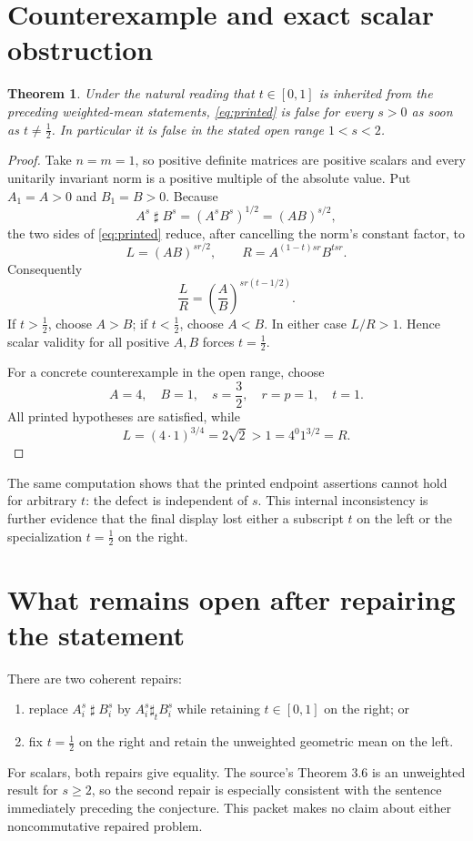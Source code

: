 \documentclass[11pt]{article}
\newtheorem{theorem}{Theorem}
\newcommand{\gm}{\mathbin{\sharp}}
\newcommand{\gmt}{\mathbin{\sharp_t}}
\begin{document}
\section{Counterexample and exact scalar obstruction}

\begin{theorem}\label{thm:counterexample}
Under the natural reading that $t\in[0,1]$ is inherited from the preceding
weighted-mean statements, \eqref{eq:printed} is false for every $s>0$ as
soon as $t\neq\tfrac12$.  In particular it is false in the stated open range
$1<s<2$.
\end{theorem}

\begin{proof}
Take $n=m=1$, so positive definite matrices are positive scalars and every
unitarily invariant norm is a positive multiple of the absolute value.  Put
$A_1=A>0$ and $B_1=B>0$.  Because
\[
 A^s\gm B^s=(A^sB^s)^{1/2}=(AB)^{s/2},
\]
the two sides of \eqref{eq:printed} reduce, after cancelling the norm's
constant factor, to
\[
 L=(AB)^{sr/2},\qquad R=A^{(1-t)sr}B^{tsr}.
\]
Consequently
\[
 \frac{L}{R}=\left(\frac AB\right)^{sr(t-1/2)}.
\]
If $t>\tfrac12$, choose $A>B$; if $t<\tfrac12$, choose $A<B$.  In either
case $L/R>1$.  Hence scalar validity for all positive $A,B$ forces
$t=\tfrac12$.

For a concrete counterexample in the open range, choose
\[
 A=4,\quad B=1,\quad s=\frac32,\quad r=p=1,\quad t=1.
\]
All printed hypotheses are satisfied, while
\[
 L=(4\cdot1)^{3/4}=2\sqrt2>1=4^0 1^{3/2}=R.
\]
\end{proof}

The same computation shows that the printed endpoint assertions cannot hold
for arbitrary $t$: the defect is independent of $s$.  This internal
inconsistency is further evidence that the final display lost either a
subscript $t$ on the left or the specialization $t=\tfrac12$ on the right.

\section{What remains open after repairing the statement}

There are two coherent repairs:
\begin{enumerate}
 \item replace $A_i^s\gm B_i^s$ by $A_i^s\gmt B_i^s$ while retaining
 $t\in[0,1]$ on the right; or
 \item fix $t=\tfrac12$ on the right and retain the unweighted geometric mean
 on the left.
\end{enumerate}
For scalars, both repairs give equality.  The source's Theorem 3.6 is an
unweighted result for $s\geq2$, so the second repair is especially consistent
with the sentence immediately preceding the conjecture.  This packet makes
no claim about either noncommutative repaired problem.
\end{document}
